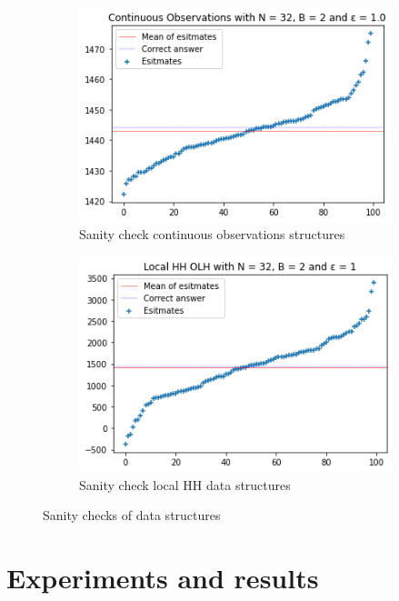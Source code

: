 \documentclass[11pt]{article}
\theoremstyle{definition}
\begin{document}
\begin{figure}
\begin{subfigure}{.5\textwidth}
  \centering
  \includegraphics[width=\linewidth]{figures/tests/cen_hh/b=2.png}
  \caption{Sanity check continuous observations structures}
  \label{fig:test_c_flat}
\end{subfigure}%
\begin{subfigure}{.5\textwidth}
  \centering
  \includegraphics[width=\linewidth]{figures/tests/local_hh/b=2.png}
  \caption{Sanity check local HH data structures}
  \label{fig:test_l_flat}
\end{subfigure}%
\caption{Sanity checks of data structures}
\label{fig:hh_sainty}
\end{figure}


\section{Experiments and results}
\end{document}
